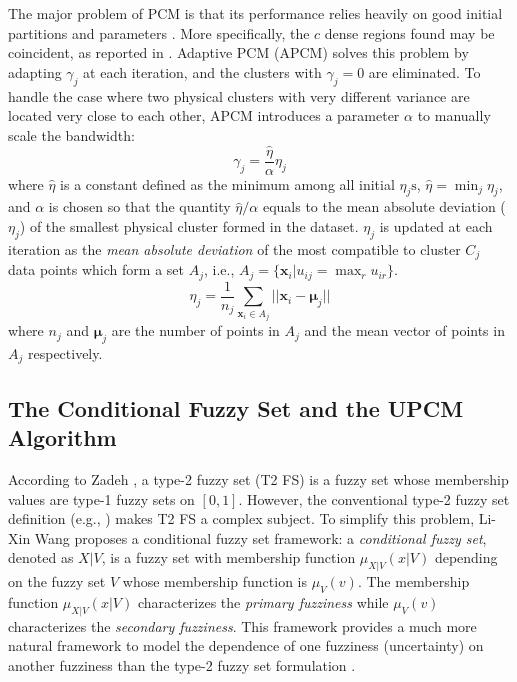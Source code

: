 \documentclass[conference]{IEEEtran}
\theoremstyle{definition}
\begin{document}
The major problem of PCM is that its performance relies heavily on good initial partitions and parameters \cite{nasraoui_improved_1996}. More specifically, the $c$ dense regions found may be coincident, as reported in \cite{barni_comments_1996}. Adaptive PCM (APCM) \cite{xenaki_novel_2016} solves this problem by adapting $\gamma_j$ at each iteration, and the clusters with $\gamma_j=0$ are eliminated. To handle the case where two physical clusters with very different variance are located very close to each other, APCM introduces a parameter $\alpha$ to manually scale the bandwidth:
\begin{equation}
\label{corrected_eta}
\gamma_j=\frac{\hat{\eta}}{\alpha}\eta_j
\end{equation}
where $\hat{\eta}$ is a constant defined as the minimum among all initial $\eta_j\text{s}$, $\hat{\eta}=\min_j\eta_j$, and $\alpha$ is chosen so that the quantity $\hat{\eta}/\alpha$ equals to the mean absolute deviation ($\eta_j$)  of the smallest physical cluster formed in the dataset.
$\eta_j$ is updated at each iteration as the \emph{mean absolute deviation} of the most compatible to cluster $C_j$ data points which form a set $A_j$, i.e., $A_j=\{\mathbf{x}_i|u_{ij}=\max_r u_{ir}\}$.
\begin{equation}
\label{apcm_eta_update}
\eta_j=\frac{1}{n_j}\sum_{\mathbf{x}_i\in A_j}||\mathbf{x}_i-\boldsymbol{\mu}_j||
\end{equation}
where $n_j$ and $\boldsymbol{\mu}_j$ are the number of points in $A_j$ and the mean vector of points in $A_j$ respectively.
\subsection{The Conditional Fuzzy Set and the UPCM Algorithm}
\label{sec-2-2}
According to Zadeh \cite{zadeh_concept_1975}, a type-2 fuzzy set (T2 FS) is a fuzzy set whose membership values are type-1 fuzzy sets on $[0,1]$. However, the conventional type-2 fuzzy set definition (e.g., \cite{mendel_type-2_2002}) makes T2 FS a complex subject. To simplify this problem, Li-Xin Wang \cite{wang_new_2016} proposes a conditional fuzzy set framework: a \emph{conditional fuzzy set}, denoted as $X|V$, is a fuzzy set with membership function $\mu_{X|V}(x|V)$ depending on the fuzzy set $V$ whose membership function is $\mu_V(v)$. The membership function $\mu_{X|V}(x|V)$ characterizes the \emph{primary fuzziness} while $\mu_V(v)$ characterizes the \emph{secondary fuzziness}. This framework provides a much more natural framework to model the dependence of one fuzziness (uncertainty) on another fuzziness than the type-2 fuzzy set formulation \cite{wang_new_2016}.
\end{document}
